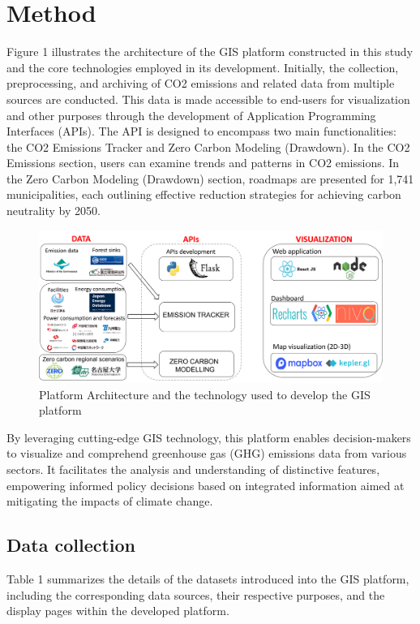 \section{Method}
Figure 1 illustrates the architecture of the GIS platform constructed in this study and the core technologies employed in its development. Initially, the collection, preprocessing, and archiving of CO2 emissions and related data from multiple sources are conducted. This data is made accessible to end-users for visualization and other purposes through the development of Application Programming Interfaces (APIs). The API is designed to encompass two main functionalities: the CO2 Emissions Tracker and Zero Carbon Modeling (Drawdown). In the CO2 Emissions section, users can examine trends and patterns in CO2 emissions. In the Zero Carbon Modeling (Drawdown) section, roadmaps are presented for 1,741 municipalities, each outlining effective reduction strategies for achieving carbon neutrality by 2050.\par
\begin{figure}
  \centering
  \includegraphics[width=\textwidth]{figs/chap7/platform_architecture.png}
  \caption[Platform architecture]{Platform Architecture and the technology used to develop the GIS platform}
  \label{fig:chap7_fig1}
\end{figure}

By leveraging cutting-edge GIS technology, this platform enables decision-makers to visualize and comprehend greenhouse gas (GHG) emissions data from various sectors. It facilitates the analysis and understanding of distinctive features, empowering informed policy decisions based on integrated information aimed at mitigating the impacts of climate change. \par
\subsection{Data collection}
Table 1 summarizes the details of the datasets introduced into the GIS platform, including the corresponding data sources, their respective purposes, and the display pages within the developed platform.\par

